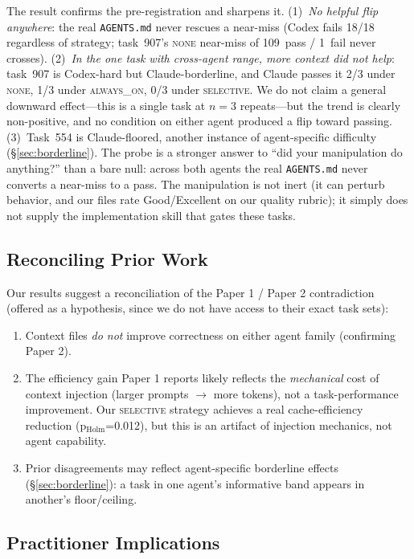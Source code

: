 \documentclass[11pt]{article}
\newcommand{\agentsmd}{\texttt{AGENTS.md}}
\newcommand{\none}{\textsc{none}}
\newcommand{\alwayson}{\textsc{always\_on}}
\newcommand{\selective}{\textsc{selective}}
\begin{document}
The result confirms the pre-registration and sharpens it.
(1)~\emph{No helpful flip anywhere}: the real \agentsmd{} never rescues a near-miss (Codex fails 18/18 regardless of strategy; task~907's \none{} near-miss of 109~pass / 1~fail never crosses).
(2)~\emph{In the one task with cross-agent range, more context did not help}: task~907 is Codex-hard but Claude-borderline, and Claude passes it 2/3 under \none{}, 1/3 under \alwayson{}, 0/3 under \selective{}. We do not claim a general downward effect---this is a single task at $n{=}3$ repeats---but the trend is clearly non-positive, and no condition on either agent produced a flip toward passing.
(3)~Task~554 is Claude-floored, another instance of agent-specific difficulty (\S\ref{sec:borderline}).
The probe is a stronger answer to ``did your manipulation do anything?'' than a bare null: across both agents the real \agentsmd{} never converts a near-miss to a pass.
The manipulation is not inert (it can perturb behavior, and our files rate Good/Excellent on our quality rubric); it simply does not supply the implementation skill that gates these tasks.

\subsection{Reconciling Prior Work}

Our results suggest a reconciliation of the Paper 1 / Paper 2 contradiction (offered as a hypothesis, since we do not have access to their exact task sets):
\begin{enumerate}
    \item Context files \emph{do not} improve correctness on either agent family (confirming Paper 2).
    \item The efficiency gain Paper 1 reports likely reflects the \emph{mechanical} cost of context injection (larger prompts $\to$ more tokens), not a task-performance improvement. Our \selective{} strategy achieves a real cache-efficiency reduction (p$_\text{Holm}$=0.012), but this is an artifact of injection mechanics, not agent capability.
    \item Prior disagreements may reflect agent-specific borderline effects (\S\ref{sec:borderline}): a task in one agent's informative band appears in another's floor/ceiling.
\end{enumerate}

\subsection{Practitioner Implications}
\end{document}
